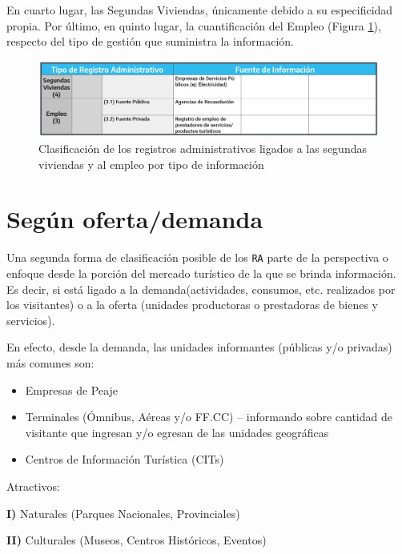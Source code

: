 \documentclass[
]{book}
\begin{document}
En cuarto lugar, las Segundas Viviendas, únicamente debido a su especificidad propia. Por último, en quinto lugar, la cuantificación del Empleo (Figura \ref{fig:clasificacionsegundasviviendas}), respecto del tipo de gestión que suministra la información.

\begin{figure}

{\centering \includegraphics[width=0.8\linewidth]{imagenes/figura03C} 

}

\caption{Clasificación de los registros administrativos ligados a las segundas viviendas y al empleo por tipo de información}\label{fig:clasificacionsegundasviviendas}
\end{figure}

\hypertarget{seguxfan-ofertademanda}{%
\section{Según oferta/demanda}\label{seguxfan-ofertademanda}}

Una segunda forma de clasificación posible de los \texttt{RA} parte de la perspectiva o enfoque desde la porción del mercado turístico de la que se brinda información. Es decir, si está ligado a la demanda(actividades, consumos, etc. realizados por los visitantes) o a la oferta (unidades productoras o prestadoras de bienes y servicios).

En efecto, desde la demanda, las unidades informantes (públicas y/o privadas) más comunes son:

\begin{itemize}
\item
  Empresas de Peaje
\item
  Terminales (Ómnibus, Aéreas y/o FF.CC) -- informando sobre cantidad de visitante que ingresan y/o egresan de las unidades geográficas
\item
  Centros de Información Turística (CITs)
\end{itemize}

Atractivos:

\textbf{I)} Naturales (Parques Nacionales, Provinciales)

\textbf{II)} Culturales (Museos, Centros Históricos, Eventos)
\end{document}
